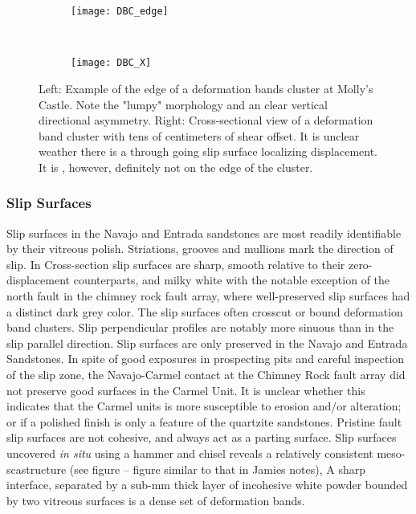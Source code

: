 \documentclass[12pt,a4paper]{article}
\begin{document}
{ \begin{figure}[H]
	\centering
	\begin{subfigure}[b]{0.4\textwidth}
		\texttt{[image: DBC\_edge]}
	\end{subfigure}
	~
	\begin{subfigure}[b]{0.4\textwidth}
		\texttt{[image: DBC\_X]}
	\end{subfigure}
	\caption{Left: Example of the edge of a deformation bands cluster at Molly's Castle. Note the "lumpy" morphology and an clear vertical directional asymmetry. Right: Cross-sectional view of a deformation band cluster with tens of centimeters of shear offset. It is unclear weather there is a through going slip surface localizing displacement. It is , however, definitely not on the edge of the cluster.}
	\label{DBC}
\end{figure}		


\subsubsection{Slip Surfaces}

Slip surfaces in the Navajo and Entrada sandstones are most readily identifiable by their vitreous polish.  Striations, grooves and mullions mark the direction of slip. In Cross-section slip surfaces are sharp, smooth relative to their zero-displacement counterparts, and milky white with the notable exception of the north fault in the chimney rock fault array, where well-preserved slip surfaces had a distinct dark grey color.  The slip surfaces often crosscut or bound deformation band clusters. Slip perpendicular profiles are notably more sinuous than in the slip parallel direction. Slip surfaces are only preserved in the Navajo and Entrada Sandstones. In spite of good exposures in prospecting pits and careful inspection of the slip zone, the Navajo-Carmel contact at the Chimney Rock fault array did not preserve good surfaces in the Carmel Unit. It is unclear whether this indicates that the Carmel units is more susceptible to erosion and/or alteration; or if a polished finish is only a feature of the quartzite sandstones. Pristine fault slip surfaces are not cohesive, and always act as a parting surface. Slip surfaces uncovered \textit{in situ} using a hammer and chisel reveals a relatively consistent meso-scastructure (see figure – figure similar to that in Jamies notes), A sharp interface, separated by a sub-mm thick layer of incohesive white powder bounded by two vitreous surfaces is a dense set of deformation bands. 

}
\end{document}
